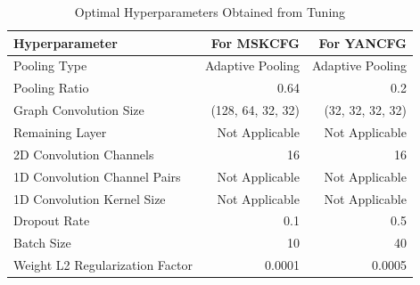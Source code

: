 \begin{table}
    \begin{center}
        \begin{tabular}{l|r|r}
            \hline
            Hyperparameter & For MSKCFG & For YANCFG \\
            \hline
            \hline
            Pooling Type & Adaptive Pooling &  Adaptive Pooling\\
            \hline
            Pooling Ratio & 0.64 & 0.2 \\
            \hline
            Graph Convolution Size & (128, 64, 32, 32) & (32, 32, 32, 32)\\
            \hline
            Remaining Layer & Not Applicable &  Not Applicable \\
            \hline
            2D Convolution Channels & 16 & 16 \\
            \hline
            1D Convolution Channel Pairs & Not Applicable & Not Applicable \\
            \hline
            1D Convolution Kernel Size & Not Applicable & Not Applicable\\
            \hline
            Dropout Rate & 0.1 & 0.5 \\
            \hline
            Batch Size & 10 & 40\\
            \hline
            Weight L2 Regularization Factor & 0.0001 & 0.0005\\
            \hline
        \end{tabular}
        \caption{Optimal Hyperparameters Obtained from Tuning}
        \label{MG:Tab:BestHyperparameters}
    \end{center}
\end{table}

